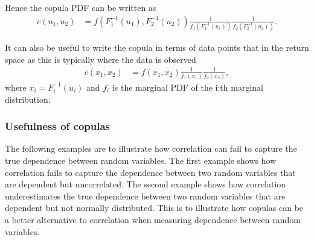 Hence the copula \gls{PDF} can be written as 
\begin{align*}
    c(u_1,u_2) &= f(F_1^{-1}(u_1),F_2^{-1}(u_2)) \frac{1}{f_1(F_1^{-1}(u_1))}\frac{1}{f_2(F_2^{-1}(u_2))}. 
\end{align*}

It can also be useful to write the copula in terms of data points that in the return space as this is typically where the data is observed
\begin{align*}
    c(x_1,x_2) &= f(x_1,x_2) \frac{1}{f_1(x_1)}\frac{1}{f_2(x_2)},
\end{align*}
where $x_i = F_i^{-1}(u_i)$ and $f_i$ is the marginal \gls{PDF} of the i:th marginal distribution.



\subsubsection{Usefulness of copulas}

The following examples are to illustrate how correlation can fail to capture the true dependence between random variables. The first example shows how correlation fails to capture the dependence between two random variables that are dependent but uncorrelated. The second example shows how correlation underestimates the true dependence between two random variables that are dependent but not normally distributed. This is to illustrate how copulas can be a better alternative to correlation when measuring dependence between random variables.

